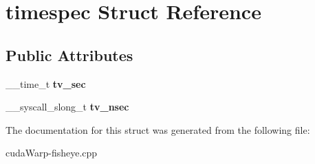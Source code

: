 \hypertarget{structtimespec}{}\section{timespec Struct Reference}
\label{structtimespec}
\subsection*{Public Attributes}
\begin{DoxyCompactItemize}
\item 
\+\_\+\+\_\+time\+\_\+t {\bfseries tv\+\_\+sec}\hypertarget{structtimespec_a589c1cbd315a9dd339f4fff9dfae15be}{}\label{structtimespec_a589c1cbd315a9dd339f4fff9dfae15be}

\item 
\+\_\+\+\_\+syscall\+\_\+slong\+\_\+t {\bfseries tv\+\_\+nsec}\hypertarget{structtimespec_a10432d0e3ad030b10bcf6a60f9636d2b}{}\label{structtimespec_a10432d0e3ad030b10bcf6a60f9636d2b}

\end{DoxyCompactItemize}


The documentation for this struct was generated from the following file\+:\begin{DoxyCompactItemize}
\item 
cuda\+Warp-\/fisheye.\+cpp\end{DoxyCompactItemize}
